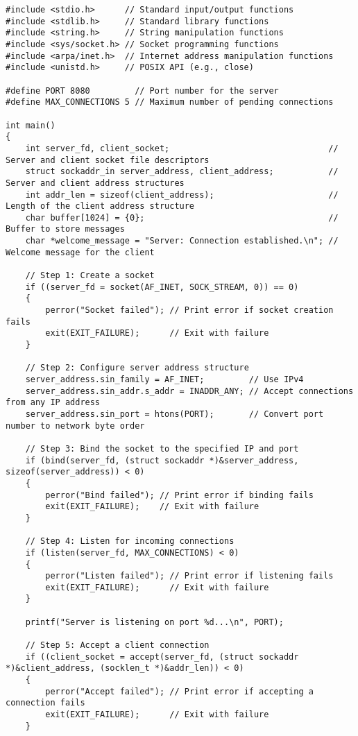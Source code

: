\documentclass[a4paper,12pt]{article}
\begin{document}
\begin{lstlisting}[caption={Distributed System Server Code}, label={lst:distributed-server}]
#include <stdio.h>      // Standard input/output functions
#include <stdlib.h>     // Standard library functions
#include <string.h>     // String manipulation functions
#include <sys/socket.h> // Socket programming functions
#include <arpa/inet.h>  // Internet address manipulation functions
#include <unistd.h>     // POSIX API (e.g., close)

#define PORT 8080         // Port number for the server
#define MAX_CONNECTIONS 5 // Maximum number of pending connections

int main()
{
    int server_fd, client_socket;                                // Server and client socket file descriptors
    struct sockaddr_in server_address, client_address;           // Server and client address structures
    int addr_len = sizeof(client_address);                       // Length of the client address structure
    char buffer[1024] = {0};                                     // Buffer to store messages
    char *welcome_message = "Server: Connection established.\n"; // Welcome message for the client

    // Step 1: Create a socket
    if ((server_fd = socket(AF_INET, SOCK_STREAM, 0)) == 0)
    {
        perror("Socket failed"); // Print error if socket creation fails
        exit(EXIT_FAILURE);      // Exit with failure
    }

    // Step 2: Configure server address structure
    server_address.sin_family = AF_INET;         // Use IPv4
    server_address.sin_addr.s_addr = INADDR_ANY; // Accept connections from any IP address
    server_address.sin_port = htons(PORT);       // Convert port number to network byte order

    // Step 3: Bind the socket to the specified IP and port
    if (bind(server_fd, (struct sockaddr *)&server_address, sizeof(server_address)) < 0)
    {
        perror("Bind failed"); // Print error if binding fails
        exit(EXIT_FAILURE);    // Exit with failure
    }

    // Step 4: Listen for incoming connections
    if (listen(server_fd, MAX_CONNECTIONS) < 0)
    {
        perror("Listen failed"); // Print error if listening fails
        exit(EXIT_FAILURE);      // Exit with failure
    }

    printf("Server is listening on port %d...\n", PORT);

    // Step 5: Accept a client connection
    if ((client_socket = accept(server_fd, (struct sockaddr *)&client_address, (socklen_t *)&addr_len)) < 0)
    {
        perror("Accept failed"); // Print error if accepting a connection fails
        exit(EXIT_FAILURE);      // Exit with failure
    }


\end{lstlisting}
\end{document}
